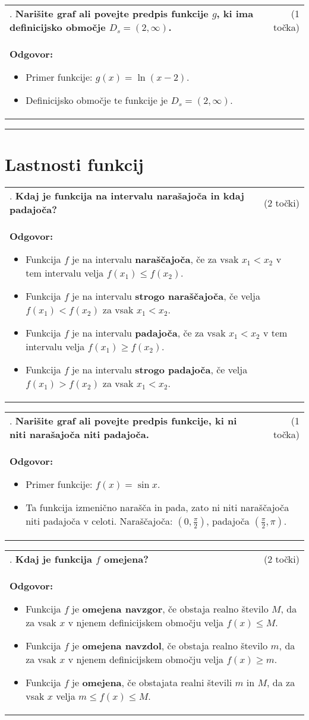 \documentclass[12pt]{article}
\newcounter{vprasanje}[section]
\renewcommand{\thevprasanje}{\roman{vprasanje}}
\newcommand{\vprasanje}[2]{%
  \stepcounter{vprasanje}%
  \textbf{\thevprasanje}. \textbf{#1} & (#2) \\
}
\newcommand{\odgovor}[1]{%
  \multicolumn{2}{p{\dimexpr\textwidth-2\tabcolsep\relax}}{%
    \small \textbf{Odgovor:} #1%
  } \\[1em]%
}
\newcommand{\crta}{\rule{\textwidth}{0.4pt}}
\newcommand{\naslov}[1]{%
  \vspace{1em} 
  \section{#1}
  \addcontentsline{toc}{section}{\protect\numberline{}#1}%
}
\newcommand{\razmak}[1]{%
  \vspace{#1}
}
\begin{document}
\begin{tabularx}{\textwidth}{X r}
\vprasanje{Narišite graf ali povejte predpis funkcije $g$, ki ima definicijsko območje $D_s=(2, \infty)$.}{1 točka}
\odgovor{
\begin{itemize}
  \item Primer funkcije: $g(x) = \ln(x - 2)$.
  \item Definicijsko območje te funkcije je $D_s = (2, \infty)$.
\end{itemize}
}
\end{tabularx}

\razmak{0.5em}


\crta

\naslov{Lastnosti funkcij}

\begin{tabularx}{\textwidth}{X r}
\vprasanje{Kdaj je funkcija na intervalu narašajoča in kdaj padajoča?}{2 točki}
\odgovor{
\begin{itemize}
  \item Funkcija $f$ je na intervalu \textbf{naraščajoča}, če za vsak $x_1 < x_2$ v tem intervalu velja $f(x_1) \leq f(x_2)$.
  \item Funkcija $f$ je na intervalu \textbf{strogo naraščajoča}, če velja $f(x_1) < f(x_2)$ za vsak $x_1 < x_2$.
  \item Funkcija $f$ je na intervalu \textbf{padajoča}, če za vsak $x_1 < x_2$ v tem intervalu velja $f(x_1) \geq f(x_2)$.
  \item Funkcija $f$ je na intervalu \textbf{strogo padajoča}, če velja $f(x_1) > f(x_2)$ za vsak $x_1 < x_2$.
\end{itemize}
}
\end{tabularx}

\begin{tabularx}{\textwidth}{X r}
\vprasanje{Narišite graf ali povejte predpis funkcije, ki ni niti narašajoča niti padajoča.}{1 točka}
\odgovor{
\begin{itemize}
  \item Primer funkcije: $f(x) = \sin x$.
  \item Ta funkcija izmenično narašča in pada, zato ni niti naraščajoča niti padajoča v celoti. Naraščajoča: $(0, \frac{\pi}{2})$, padajoča $(\frac{\pi}{2}, \pi)$.
\end{itemize}
}
\end{tabularx}

\begin{tabularx}{\textwidth}{X r}
\vprasanje{Kdaj je funkcija $f$ omejena?}{2 točki}
\odgovor{
\begin{itemize}
  \item Funkcija $f$ je \textbf{omejena navzgor}, če obstaja realno število $M$, da za vsak $x$ v njenem definicijskem območju velja $f(x) \leq M$.
  \item Funkcija $f$ je \textbf{omejena navzdol}, če obstaja realno število $m$, da za vsak $x$ v njenem definicijskem območju velja $f(x) \geq m$.
  \item Funkcija $f$ je \textbf{omejena}, če obstajata realni števili $m$ in $M$, da za vsak $x$ velja $m \leq f(x) \leq M$.
\end{itemize}
}
\end{tabularx}
\end{document}
